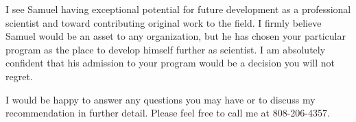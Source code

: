 \documentclass[11pt]{moderncv}        %
\begin{document}
I see Samuel having exceptional potential for future development as a
professional scientist and toward contributing original work to the field.
I firmly believe Samuel would be an asset to any organization, but he has
chosen your particular program as the place to develop himself further as
scientist. I am absolutely confident that his admission to your program would
be a decision you will not regret.

I would be happy to answer any questions you may have or to discuss my
recommendation in further detail. Please feel free to call me at 808-206-4357.

\makeletterclosing
\vspace{-4cm}
\\
\end{document}
